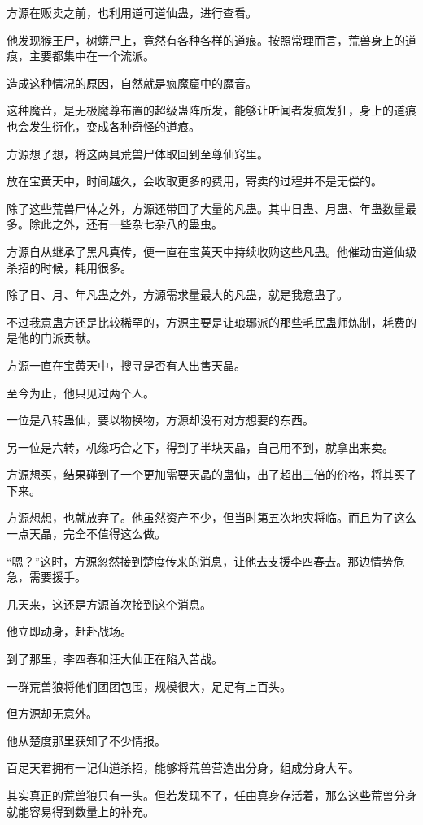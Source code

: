 \begin{this_body}
方源在贩卖之前，也利用道可道仙蛊，进行查看。

他发现猴王尸，树蟒尸上，竟然有各种各样的道痕。按照常理而言，荒兽身上的道痕，主要都集中在一个流派。

造成这种情况的原因，自然就是疯魔窟中的魔音。

这种魔音，是无极魔尊布置的超级蛊阵所发，能够让听闻者发疯发狂，身上的道痕也会发生衍化，变成各种奇怪的道痕。

方源想了想，将这两具荒兽尸体取回到至尊仙窍里。

放在宝黄天中，时间越久，会收取更多的费用，寄卖的过程并不是无偿的。

除了这些荒兽尸体之外，方源还带回了大量的凡蛊。其中日蛊、月蛊、年蛊数量最多。除此之外，还有一些杂七杂八的蛊虫。

方源自从继承了黑凡真传，便一直在宝黄天中持续收购这些凡蛊。他催动宙道仙级杀招的时候，耗用很多。

除了日、月、年凡蛊之外，方源需求量最大的凡蛊，就是我意蛊了。

不过我意蛊方还是比较稀罕的，方源主要是让琅琊派的那些毛民蛊师炼制，耗费的是他的门派贡献。

方源一直在宝黄天中，搜寻是否有人出售天晶。

至今为止，他只见过两个人。

一位是八转蛊仙，要以物换物，方源却没有对方想要的东西。

另一位是六转，机缘巧合之下，得到了半块天晶，自己用不到，就拿出来卖。

方源想买，结果碰到了一个更加需要天晶的蛊仙，出了超出三倍的价格，将其买了下来。

方源想想，也就放弃了。他虽然资产不少，但当时第五次地灾将临。而且为了这么一点天晶，完全不值得这么做。

“嗯？”这时，方源忽然接到楚度传来的消息，让他去支援李四春去。那边情势危急，需要援手。

几天来，这还是方源首次接到这个消息。

他立即动身，赶赴战场。

到了那里，李四春和汪大仙正在陷入苦战。

一群荒兽狼将他们团团包围，规模很大，足足有上百头。

但方源却无意外。

他从楚度那里获知了不少情报。

百足天君拥有一记仙道杀招，能够将荒兽营造出分身，组成分身大军。

其实真正的荒兽狼只有一头。但若发现不了，任由真身存活着，那么这些荒兽分身就能容易得到数量上的补充。


\end{this_body}
